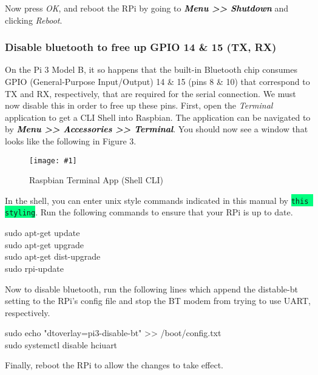 \documentclass{article}
\newcommand*{\myfont}{\fontfamily{pcr}\selectfont}
\newcommand{\codei}[1]{\colorbox{SpringGreen}{\texttt{#1}}} %
\newcommand{\codeb}[2]{
  \begin{tcolorbox}[width=\textwidth,colback={SpringGreen},title={#1},colbacktitle=darkgreen,coltitle=SpringGreen]
    \myfont
    #2
  \end{tcolorbox}
} %
\newcommand{\loc}[1]{\textit{\textcolor{Black}{\textbf{#1}}}} %
\newcommand{\imagefig}[2]{
    \begin{figure}[H]
        \centering
        \texttt{[image: \#1]}
        \caption{#2}
    \end{figure}
}
\begin{document}
    Now press \textit{OK}, and reboot the RPi by going to \loc{Menu >> Shutdown} and clicking \textit{Reboot}.

    \subsubsection{Disable bluetooth to free up GPIO 14 \& 15 (TX, RX)}
    On the Pi 3 Model B, it so happens that the built-in Bluetooth chip consumes GPIO (General-Purpose Input/Output) 14 \& 15 (pins 8 \& 10) that correspond to TX and RX, respectively, that are required for the serial connection. We must now disable this in order to free up these pins. First, open the \textit{Terminal} application to get a CLI Shell into Raspbian. The application can be navigated to by \loc{Menu >> Accessories >> Terminal}. You should now see a window that looks like the following in Figure 3.
    \imagefig{screen3.png}{Raspbian Terminal App (Shell CLI)}

    In the shell, you can enter unix style commands indicated in this manual by \codei{this styling}. Run the following commands to ensure that your RPi is up to date.

    \codeb{Update environment}
    {
      sudo apt-get update \\
      sudo apt-get upgrade \\
      sudo apt-get dist-upgrade \\
      sudo rpi-update
    }

    Now to disable bluetooth, run the following lines which append the distable-bt setting to the RPi's config file and stop the BT modem from trying to use UART, respectively.

    \codeb{Disable bluetooth}
    {
      sudo echo "dtoverlay=pi3-disable-bt" >> /boot/config.txt \\
      sudo systemctl disable hciuart
    }

    Finally, reboot the RPi to allow the changes to take effect.
\end{document}
